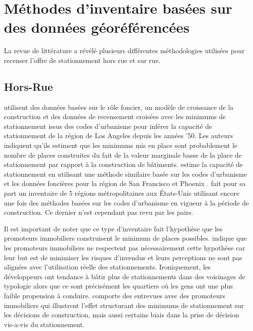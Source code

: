 \section{Méthodes d'inventaire basées sur des données géoréférencées}
  La revue de littérature a révélé plusieurs différentes méthodologies utilisées pour recenser l'offre de stationnement hors rue et sur rue. 

  \subsection{Hors-Rue}
  \textcite{chester_parking_2015} utilisent des données basées sur le rôle foncier, un modèle de croissance de la construction et des données de recensement croisées avec les minimums de stationnement issus des codes d'urbanisme pour inférer la capacité de stationnement de la région de Los Angeles depuis les années '50. Les auteurs indiquent qu'ils estiment que les minimums mis en place sont probablement le nombre de places construites du fait de la valeur marginale basse de la place de stationnement par rapport à la construction de bâtiments. \citeauthor{chester_inventorying_2022} estime la capacité de stationnement en utilisant une méthode similaire basée sur les codes d'urbanisme et les données foncières pour la région de San Francisco \parencite{chester_inventorying_2022} et Phoenix \parencite{hoehne_valley_2019}. \textcite{scharnhorst_quantified_2018} fait pour sa part un inventaire de 5 régions métropolitaines aux États-Unis utilisant encore une fois des méthodes basées sur les codes d'urbanisme en vigueur à la période de construction. Ce dernier n'est cependant pas revu par les pairs. \par 
  Il est important de noter que ce type d'inventaire fait l'hypothèse que les promoteurs immobiliers construisent le minimum de places possibles. \textcite{stangl_parking_2019} indique que les promoteurs immobiliers ne respectent pas nécessairement cette hypothèse car leur but est de minimiser les risques d'invendus et leurs perceptions ne sont pas alignées avec l'utilisation réelle des stationnements. Ironiquement, les développeurs ont tendance à bâtir plus de stationnements dans des voisinages de typologie  \fg{} \parencite{voulgaris_synergistic_2017} alors que ce sont précisément les quartiers où les gens ont une plus faible propension à conduire. \textcite{stangl_parking_2019} comporte des entrevues avec des promoteurs immobiliers qui illustrent l'effet structurant des minimums de stationnement sur les décisions de construction, mais aussi certains biais dans la prise de décision vis-a-vis du stationnement.

